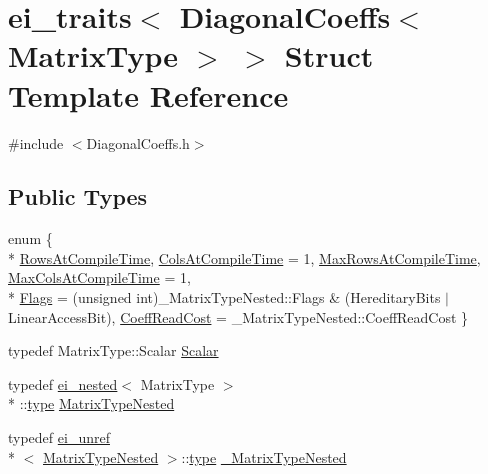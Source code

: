 \hypertarget{structei__traits_3_01_diagonal_coeffs_3_01_matrix_type_01_4_01_4}{\section{ei\-\_\-traits$<$ Diagonal\-Coeffs$<$ Matrix\-Type $>$ $>$ Struct Template Reference}
\label{structei__traits_3_01_diagonal_coeffs_3_01_matrix_type_01_4_01_4}
}


{\ttfamily \#include $<$Diagonal\-Coeffs.\-h$>$}

\subsection*{Public Types}
\begin{DoxyCompactItemize}
\item 
enum \{ \\*
\hyperlink{structei__traits_3_01_diagonal_coeffs_3_01_matrix_type_01_4_01_4_aaf0941ea5b0e9d80c1b1559eaf5ee324ae87a055bd7cae2951b7747deb29bf4ef}{Rows\-At\-Compile\-Time}, 
\hyperlink{structei__traits_3_01_diagonal_coeffs_3_01_matrix_type_01_4_01_4_aaf0941ea5b0e9d80c1b1559eaf5ee324aa66f351d74530e1e4793d3783f70611c}{Cols\-At\-Compile\-Time} = 1, 
\hyperlink{structei__traits_3_01_diagonal_coeffs_3_01_matrix_type_01_4_01_4_aaf0941ea5b0e9d80c1b1559eaf5ee324a6e868629269569d506fe180c291f5368}{Max\-Rows\-At\-Compile\-Time}, 
\hyperlink{structei__traits_3_01_diagonal_coeffs_3_01_matrix_type_01_4_01_4_aaf0941ea5b0e9d80c1b1559eaf5ee324a0948db35160bf4753c6a413141fa8873}{Max\-Cols\-At\-Compile\-Time} = 1, 
\\*
\hyperlink{structei__traits_3_01_diagonal_coeffs_3_01_matrix_type_01_4_01_4_aaf0941ea5b0e9d80c1b1559eaf5ee324a93a8aac21dd127b685f66f67f55f6506}{Flags} = (unsigned int)\-\_\-\-Matrix\-Type\-Nested\-:\-:Flags \& (Hereditary\-Bits $|$ Linear\-Access\-Bit), 
\hyperlink{structei__traits_3_01_diagonal_coeffs_3_01_matrix_type_01_4_01_4_aaf0941ea5b0e9d80c1b1559eaf5ee324a2ad427b54b34a14350abe1ce4746187f}{Coeff\-Read\-Cost} = \-\_\-\-Matrix\-Type\-Nested\-:\-:Coeff\-Read\-Cost
 \}
\item 
typedef Matrix\-Type\-::\-Scalar \hyperlink{structei__traits_3_01_diagonal_coeffs_3_01_matrix_type_01_4_01_4_af4fc0a9930a5eeec8245da34eead10b6}{Scalar}
\item 
typedef \hyperlink{structei__nested}{ei\-\_\-nested}$<$ Matrix\-Type $>$\\*
\-::\hyperlink{glext_8h_a7d05960f4f1c1b11f3177dc963a45d86}{type} \hyperlink{structei__traits_3_01_diagonal_coeffs_3_01_matrix_type_01_4_01_4_a1caefbc9d10fd616affe57425413ac73}{Matrix\-Type\-Nested}
\item 
typedef \hyperlink{structei__unref}{ei\-\_\-unref}\\*
$<$ \hyperlink{structei__traits_3_01_diagonal_coeffs_3_01_matrix_type_01_4_01_4_a1caefbc9d10fd616affe57425413ac73}{Matrix\-Type\-Nested} $>$\-::\hyperlink{glext_8h_a7d05960f4f1c1b11f3177dc963a45d86}{type} \hyperlink{structei__traits_3_01_diagonal_coeffs_3_01_matrix_type_01_4_01_4_a41ed5ebc8553c1d43a2987f9fc88c6f5}{\-\_\-\-Matrix\-Type\-Nested}
\end{DoxyCompactItemize}


